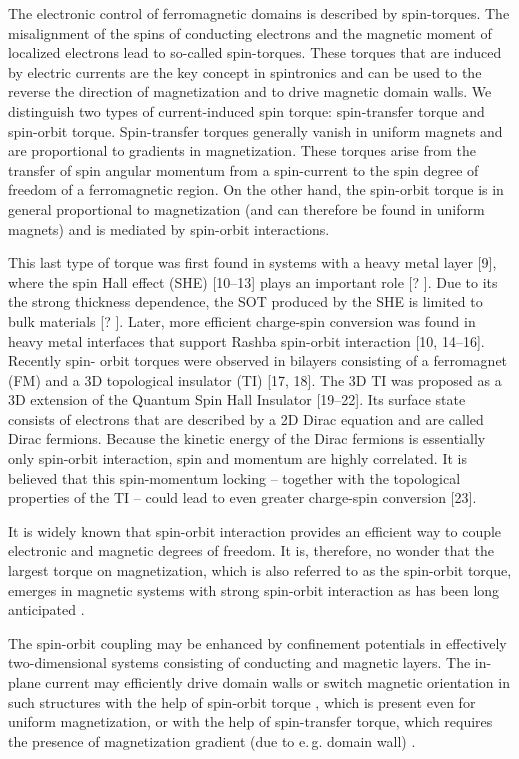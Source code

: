 The electronic control of ferromagnetic domains is described by spin-torques. The misalignment of the spins of conducting electrons and the magnetic moment of localized electrons lead to so-called spin-torques. These torques that are induced by electric currents are the key concept in spintronics and can be used to the reverse the direction of magnetization and to drive magnetic domain walls. We distinguish two types of current-induced spin torque: spin-transfer torque and spin-orbit torque. Spin-transfer torques generally vanish in uniform magnets and are proportional to gradients in magnetization. These torques arise from the transfer of spin angular momentum from a spin-current to the spin degree of freedom of a ferromagnetic region.  On the other hand, the spin-orbit torque is in general proportional to magnetization (and can therefore be found in uniform magnets) and is mediated by spin-orbit interactions. 

This last type of torque was first found in systems with a heavy metal layer [9], where the spin Hall
effect (SHE) [10–13] plays an important role [? ]. Due to its the strong thickness dependence, the SOT
produced by the SHE is limited to bulk materials [? ]. Later, more efficient charge-spin conversion was
found in heavy metal interfaces that support Rashba spin-orbit interaction [10, 14–16].
Recently spin- orbit torques were observed in bilayers consisting of a ferromagnet (FM) and a 3D
topological insulator (TI) [17, 18]. The 3D TI was proposed as a 3D extension of the Quantum Spin
Hall Insulator [19–22]. Its surface state consists of electrons that are described by a 2D Dirac
equation and are called Dirac fermions. Because the kinetic energy of the Dirac fermions is essentially
only spin-orbit interaction, spin and momentum are highly correlated. It is believed that this
spin-momentum locking – together with the topological properties of the TI – could lead to even
greater charge-spin conversion [23]. 

It is widely known that spin-orbit interaction provides an efficient way to couple electronic and magnetic degrees of freedom. It is, therefore, no wonder that the largest torque on magnetization, which is also referred to as the spin-orbit torque, emerges in magnetic systems with strong spin-orbit interaction \cite{miron_current-driven_2010,haney_current_2013} as has been long anticipated \cite{dyakonov_current-induced_1971}. 

The spin-orbit coupling may be enhanced by confinement potentials in effectively two-dimensional systems consisting of conducting and magnetic layers. The in-plane current may efficiently drive domain walls or switch magnetic orientation in such structures with the help of spin-orbit torque \cite{awschalom2009trend,manchon_theory_2008,garate_influence_2009,manchon2009theory}, which is present even for uniform magnetization, or with the help of spin-transfer torque, which requires the presence of magnetization gradient (due to e.\,g. domain wall) \cite{slonczewski_current-driven_1996,berger_emission_1996,ralph_spin_2008,stiles_anatomy_2002}. 


